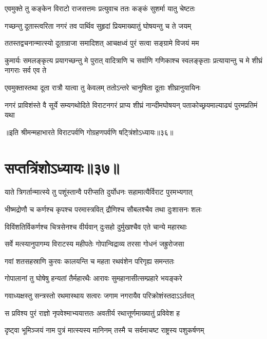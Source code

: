
\twolineshloka
{एवमुक्ते तु कङ्केन विराटो राजसत्तमः}
{प्रत्युवाच ततः कङ्कं सुशर्मा यातु चेष्टतः}




\twolineshloka
{गच्छन्तु दूतास्त्वरिता नगरं तव पार्थिव}
{सुहृदां प्रियमाख्यातुं घोषयन्तु च ते जयम्}


\twolineshloka
{ततस्तद्वचनान्मात्स्यो दूतान्राजा समादिशत्}
{आचक्षध्वं पुरं सत्वा सङ्ग्रामे विजयं मम}


\threelineshloka
{कुमार्यः समलङ्कृत्य प्रयागच्छन्तु मे पुरात्}
{वादित्राणि च सर्वाणि गणिकाश्च स्वलङ्कृताः}
{प्रत्यायान्तु च मे शीघ्रं नागराः सर्व एव ते}


\twolineshloka
{एवमुक्तास्तथा दूता रात्रौ यात्वा तु केवलम्}
{ततोऽन्तरे चानुषिता दूताः शीघ्रानुयायिनः}


\threelineshloka
{नगरं प्राविशंस्ते वै सूर्ये सम्यगथोदिते}
{विराटनगरं प्राप्य शीघ्रं नान्दीमघोषयन्}
{पताकोच्छ्रयमाल्याढ्यं पुरमप्रतिमं यथा}

॥इति श्रीमन्महाभारते विराटपर्वणि गोग्रहणपर्वणि षट्त्रिंशोऽध्यायः॥३६॥

\chapter{सप्तत्रिंशोऽध्यायः॥३७॥}

\twolineshloka
{याते त्रिगर्तान्मात्स्ये तु पशूंस्तान्वै परीप्सति}
{दुर्योधनः सहामात्यैर्विराट पुरमभ्यगात्}


\twolineshloka
{भीष्मद्रोणौ च कर्णश्च कृपश्च परमास्त्रवित्}
{द्रौणिश्च सौबलश्चैव तथा दुःशासनः शलः}


\twolineshloka
{विविंशतिर्विकर्णश्च चित्रसेनश्च वीर्यवान्}
{दुःसहो दुर्मुखश्चैव एते चान्ये महारथाः}


\twolineshloka
{सर्वे मत्स्यानुपागम्य विराटस्य महीपतेः}
{गोपान्विद्राव्य तरसा गोधनं जह्रुरोजसा}


\twolineshloka
{गवां शतसहस्राणि कुरवः कालयन्ति च}
{महता रथवंशेन परिगृह्य समन्ततः}


\twolineshloka
{गोपालानां तु घोषेषु हन्यतां तैर्महारथैः}
{आरावः सुमहानासीत्सम्प्रहारे भयङ्करे}


\twolineshloka
{गवाध्यक्षस्तु सन्त्रस्तो रथमास्थाय सत्वरः}
{जगाम नगरायैव परिक्रोशंस्तदाऽऽर्तवत्}


\twolineshloka
{स प्रविश्य पुरं राज्ञो नृपवेश्माभ्ययात्ततः}
{अवतीर्य रथात्तूर्णमाख्यातुं प्रविवेश ह}


\twolineshloka
{दृष्ट्वा भूमिञ्जयं नाम पुत्रं मात्स्यस्य मानिनम्}
{तस्मै च सर्वमाचष्ट राष्ट्रस्य पशुकर्षणम्}


